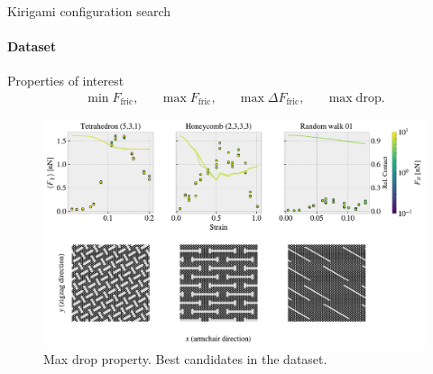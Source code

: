 \documentclass[
	10pt, %
]{beamer}
\begin{document}
%
%
\begin{frame}{Kirigami configuration search}
	\framesubtitle{Dataset}
	Properties of interest
	\begin{align*}
		&\min F_{\text{fric}},& &\max F_{\text{fric}},& &\max \Delta F_{\text{fric}},& &\max \text{drop}.&
	\end{align*}
	\begin{figure}[H]
		\centering
		\includegraphics[width=0.7\linewidth]{../thesis/figures/stretch_profiles/PP_max_drop.pdf}
		\caption{Max drop property. Best candidates in the dataset.}
	  \end{figure}
\end{frame}
%
%
\end{document}
